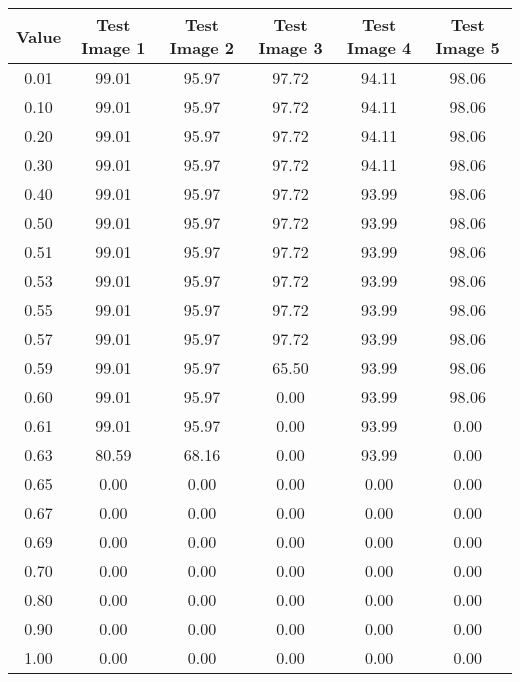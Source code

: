 \begin{tabular}{|c|c|c|c|c|c|}
\hline
\textbf{Value}&\textbf{Test Image 1}&\textbf{Test Image 2}&\textbf{Test Image 3}&\textbf{Test Image 4}&\textbf{Test Image 5}\\\hline
0.01&99.01&95.97&97.72&94.11&98.06\\\hline
0.10&99.01&95.97&97.72&94.11&98.06\\\hline
0.20&99.01&95.97&97.72&94.11&98.06\\\hline
0.30&99.01&95.97&97.72&94.11&98.06\\\hline
0.40&99.01&95.97&97.72&93.99&98.06\\\hline
0.50&99.01&95.97&97.72&93.99&98.06\\\hline
0.51&99.01&95.97&97.72&93.99&98.06\\\hline
0.53&99.01&95.97&97.72&93.99&98.06\\\hline
0.55&99.01&95.97&97.72&93.99&98.06\\\hline
0.57&99.01&95.97&97.72&93.99&98.06\\\hline
0.59&99.01&95.97&65.50&93.99&98.06\\\hline
0.60&99.01&95.97&0.00&93.99&98.06\\\hline
0.61&99.01&95.97&0.00&93.99&0.00\\\hline
0.63&80.59&68.16&0.00&93.99&0.00\\\hline
0.65&0.00&0.00&0.00&0.00&0.00\\\hline
0.67&0.00&0.00&0.00&0.00&0.00\\\hline
0.69&0.00&0.00&0.00&0.00&0.00\\\hline
0.70&0.00&0.00&0.00&0.00&0.00\\\hline
0.80&0.00&0.00&0.00&0.00&0.00\\\hline
0.90&0.00&0.00&0.00&0.00&0.00\\\hline
1.00&0.00&0.00&0.00&0.00&0.00\\\hline
\end{tabular}
